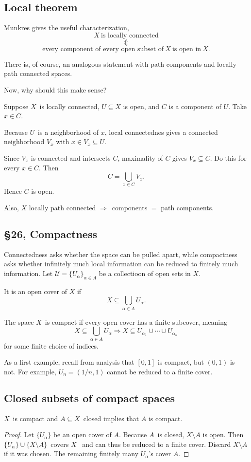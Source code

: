 \documentclass[11pt]{article}
\begin{document}
\subsection{Local theorem}

Munkres gives the useful characterization,  
\[
    X \ \text{is locally connected} 
\]
\[
    \Updownarrow 
\]
\[
    \text{every component of 
    every open subset of} \ X \ \text{is open in} \ X. 
\]

There is, of course, an analogous statement with 
path components and locally path connected spaces. 

Now, why should this make sense? 

Suppose $X$ is locally connected, $U \subseteq X$ is 
open, and $C$ is a component of $U$. Take $x\in C$. 

Because $U$ is a neighborhood of $x$, local connectednes 
gives a connected neighborhood $V_x$ with 
$x \in V_x \subseteq U$. 

Since $V_x$ is connected and intersects $C$, maximality 
of $C$ gives $V_x \subseteq C$. 
Do this for every $x \in C$. Then 
\[
    C = \bigcup_{x \in C} V_x. 
\]
Hence $C$ is open. 

Also, $X$ locally path connected $\Rightarrow$ components 
$=$ path components. 

\subsection{\S 26, Compactness}

Connectedness asks whether the space can be pulled 
apart, while compactness asks whether infinitely 
much local information can be reduced to finitely much 
information. 
Let $\mathcal U = \{U_\alpha\}_{\alpha \in A}$ be a collectioon 
of open sets in $X$. 

It is an open cover of $X$ if 
\[
    X \subseteq \bigcup_{\alpha \in A} U_{\alpha}. 
\]

The space $X$ is compact if every open cover has a 
finite subcover, meaning 
\[
    X \subseteq \bigcup_{\alpha \in A} U_{\alpha}
    \Rightarrow 
    X \subseteq U_{\alpha_1} \cup \cdots 
    \cup U_{\alpha_n}
\]
for some finite choice of indices. 

As a first example, recall from analysis that 
$[0,1]$ is compact, but $(0,1)$ is not. 
For example, $U_n = (1/n, 1)$ cannot be reduced to a 
finite cover. 

\subsection{Closed subsets of compact spaces}
\begin{thm}
    $X$ is compact and $A \subseteq X$ closed 
    implies that $A$ is compact. 
\end{thm}
\begin{proof}
    Let $\{U_\alpha\}$ be an open cover of $A$. 
    Because $A$ is closed, $X \setminus A$ is open. 
    Then $\{U_\alpha\} \cup \{X\setminus A\}$ covers $X$ 
    and can thus be reduced to a finite cover. 
    Discard $X \setminus A$ if it was chosen. The 
    remaining finitely many $U_\alpha$'s cover $A$. 
\end{proof}
\end{document}
